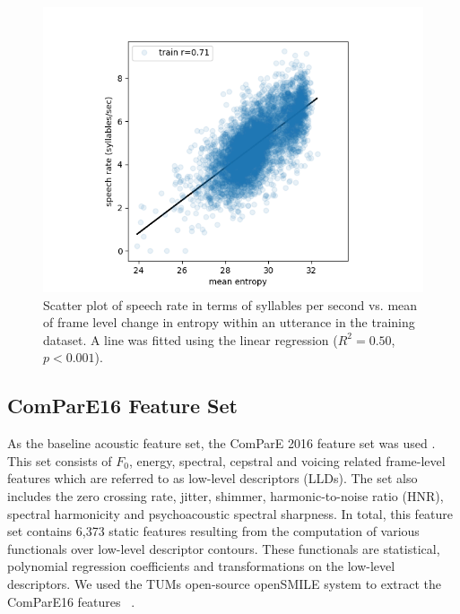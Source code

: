 \begin{figure}
    \centering
    \includegraphics[width=\linewidth]{IS2019_paper_kit/images/scatter_train.png}
    \caption{\label{fig:entropy_rate}Scatter plot of speech rate in terms of syllables per second vs. mean of frame level change in entropy within an utterance in the training dataset. A line was fitted using the linear regression ($R^2=0.50$, $p<0.001$).}
\end{figure}

\subsection{ComParE16 Feature Set}

As the baseline acoustic feature set, the ComParE 2016 feature set was used \cite{weninger2013acoustics}. 
This set consists of $F_0$, energy, spectral, cepstral and voicing related frame-level features which are
referred to as low-level descriptors (LLDs). The set also includes the zero crossing rate, jitter, shimmer, harmonic-to-noise ratio (HNR), spectral harmonicity and psychoacoustic spectral
sharpness. In total, this feature set contains 6,373 static features resulting from the computation of various functionals over
low-level descriptor contours. These functionals are statistical,
polynomial regression coefficients and transformations on the
low-level descriptors. We used the TUMs open-source openSMILE system to extract the ComParE16 features~\cite{eyben2010opensmile} .